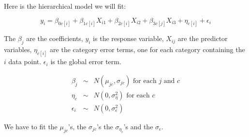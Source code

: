 \documentclass{article}
\begin{document}
Here is the hierarchical model we will fit:

$$y_i = \beta_{0c[i]} + \beta_{1c[i]} X_{i1} + \beta_{2c[i]} X_{i2} +
\beta_{3c[j]} X_{i3} + \eta_{c[i]} + \epsilon_i$$

The $\beta_j$ are the coefficients, $y_i$ is the response variable,
$X_{ij}$ are the predictor variables, $\eta_{c[i]}$ are the category
error terms, one for each category containing the $i$ data point.
$\epsilon_i$ is the global error term.

\begin{eqnarray*}
  \beta_j & \sim & N(\mu_{jc}, \sigma_{jc}) \mbox{ for each $j$ and $c$} \\
	\eta_{c} & \sim & N(0, \sigma^2_{\eta}) \mbox{ for each $c$} \\
  \epsilon_i & \sim & N(0, \sigma^2_{\epsilon})
\end{eqnarray*}

We have to fit the $\mu_{jc}$'s, the $\sigma_{jc}$'s the
$\sigma_{\eta_c}$'s and the $\sigma_\epsilon$.
\end{document}
